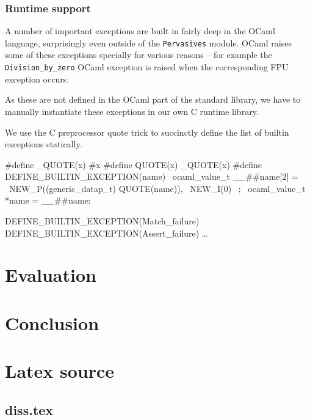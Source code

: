 \documentclass[12pt,a4paper,twoside,openright]{report}
\begin{document}
\subsection{Runtime support}

A number of important exceptions are built in fairly deep in the OCaml language, surprisingly even outside of the \lstinline!Pervasives! module. OCaml raises some of these exceptions specially for various reasons -- for example the \lstinline!Division_by_zero! OCaml exception is raised when the corresponding FPU exception occurs.

As these are not defined in the OCaml part of the standard library, we have to manually instantiate these exceptions in our own C runtime library.

We use the C preprocessor quote trick to succinctly define the list of builtin exceptions statically.

\begin{lstinline}
#define _QUOTE(x) #x
#define QUOTE(x) _QUOTE(x)
#define DEFINE_BUILTIN_EXCEPTION(name) \
    ocaml_value_t __##name[2] = { \
        NEW_P((generic_datap_t) QUOTE(name)), \
        NEW_I(0) \
    }; \
    ocaml_value_t *name = __##name;

DEFINE_BUILTIN_EXCEPTION(Match_failure)
DEFINE_BUILTIN_EXCEPTION(Assert_failure)
\ldots
\end{lstinline}

\chapter{Evaluation}


\chapter{Conclusion}





\appendix

\chapter{Latex source}

\section{diss.tex}
{\scriptsize}
\end{document}
